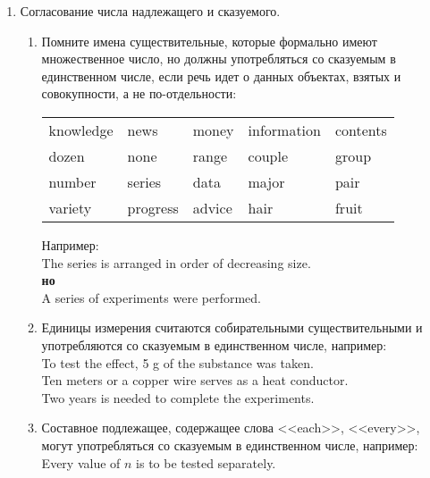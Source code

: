 \documentclass[a5paper, 10pt, twoside, numbers=enddot]{scrartcl}
\begin{document}
\begin{enumerate}
  \item Согласование числа надлежащего и сказуемого.
    \begin{enumerate}
      \item Помните имена существительные, которые формально имеют множественное число, но должны
        употребляться со сказуемым в единственном числе, если речь идет о данных объектах, взятых и
        совокупности, а не по-отдельности:
        \begin{center}
          \sffamily
          \begin{tabular}{lllll}
            knowledge & news     & money  & information & contents\\
            dozen     & none     & range  & couple      & group\\
            number    & series   & data   & major       & pair\\
            variety   & progress & advice & hair        & fruit
          \end{tabular}
        \end{center}
        Например:\\ [4pt]
        \textsf{
          The series is arranged in order of decreasing size.\\ [4pt]
          \textbf{но}\\ [4pt]
          A series of experiments were performed.
        }

      \item Единицы измерения считаются собирательными существительными и употребляются со сказуемым
        в единственном числе, например:\\ [4pt]
        \textsf{
          To test the effect, 5 g of the substance was taken.\\ [4pt]
          Ten meters or a copper wire  serves as a heat conductor.\\ [4pt]
          Two years is needed to complete the experiments.
        }

      \item Составное подлежащее, содержащее слова <<each>>, <<every>>, могут употребляться со сказуемым в единственном числе, например:\\ [4pt] \textsf{
      Every value of $n$ is to be tested separately.}
    \end{enumerate}


\end{enumerate}
\end{document}
